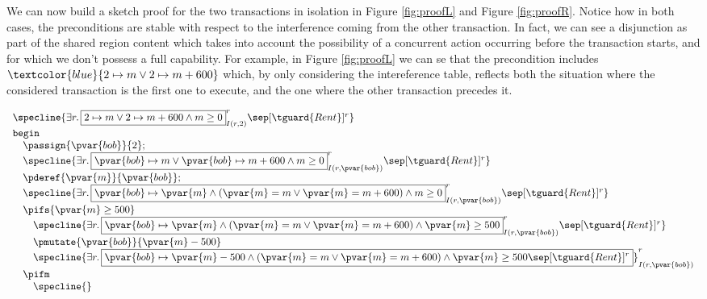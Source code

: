 We can now build a sketch proof for the two transactions in isolation in Figure \ref{fig:proofL} and Figure \ref{fig:proofR}. Notice how in both cases, the preconditions are stable with respect to the interference coming from the other transaction. In fact, we can see a disjunction as part of the shared region content which takes into account the possibility of a concurrent action occurring before the transaction starts, and for which we don't possess a full capability. For example, in Figure \ref{fig:proofL} we can se that the precondition includes $\textcolor{blue}{2 \mapsto m \lor 2 \mapsto m + 600}$ which, by only considering the intereference table, reflects both the situation where the considered transaction is the first one to execute, and the one where the other transaction precedes it.
\begin{center}
\[
	\begin{array}{l}
		\specline{
				\exists r \ldotp
					\boxed{
						2 \mapsto m \lor 2 \mapsto m + 600 \land m \geq 0
					}^r_{I(r, 2)}
					\sep [\tguard{Rent}]^r
		} \\
		\mathtt{begin} \\
			\quad \passign{\pvar{bob}}{2}; \\
			\quad \specline{
				\exists r \ldotp
					\boxed{\pvar{bob} \mapsto m \lor \pvar{bob} \mapsto m + 600 \land m \geq 0}^r_{I(r, \pvar{bob})}
					\sep [\tguard{Rent}]^r
			} \\
			\quad \pderef{\pvar{m}}{\pvar{bob}}; \\
			\quad \specline{
				\exists r \ldotp
					\boxed{\pvar{bob} \mapsto \pvar{m} \land \left(\pvar{m} = m \lor \pvar{m} = m + 600\right) \land m \geq 0}^r_{I(r, \pvar{bob})}
					\sep [\tguard{Rent}]^r
			} \\
			\quad \pifs{\pvar{m} \geq 500} \\
				\quad \quad \specline{
					\exists r \ldotp
						\boxed{\pvar{bob} \mapsto \pvar{m} \land \left(\pvar{m} = m \lor \pvar{m} = m + 600\right) \land \pvar{m} \geq 500}^r_{I(r, \pvar{bob})}
						\sep [\tguard{Rent}]^r
				} \\
				\quad \quad \pmutate{\pvar{bob}}{\pvar{m} - 500} \\
				\quad \quad \specline{
					\exists r \ldotp
						\boxed{
							\pvar{bob} \mapsto \pvar{m} - 500 \land \left(\pvar{m} = m \lor \pvar{m} = m + 600\right) \land \pvar{m} \geq 500
							\sep [\tguard{Rent}]^r}
						}^r_{I(r, \pvar{bob})} \\
			\quad \pifm \\
				\quad \quad \specline{
}
\end{array}\]
\end{center}
